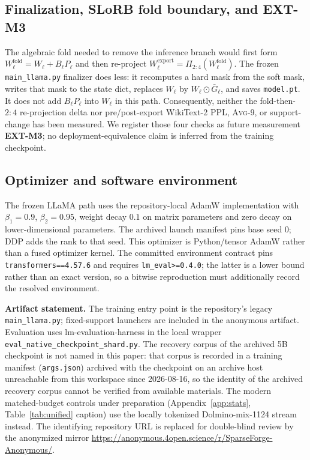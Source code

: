 \documentclass{article}
\newcommand{\taskavg}{\textsc{Avg}-9}
\begin{document}
\subsection{Finalization, SLoRB fold boundary, and EXT-M3}
The algebraic fold needed to remove the inference branch would first form
$W^{\mathrm{fold}}_\ell=W_\ell+B_\ell P_\ell$ and then re-project
$W^{\mathrm{export}}_\ell=\Pi_{2{:}4}(W^{\mathrm{fold}}_\ell)$. The frozen
\texttt{main\_llama.py} finalizer does less: it recomputes a hard mask from
the soft mask, writes that mask to the state dict, replaces
$W_\ell$ by $W_\ell\odot\bar G_\ell$, and saves \texttt{model.pt}. It does
not add $B_\ell P_\ell$ into $W_\ell$ in this path. Consequently, neither the
fold-then-$2{:}4$ re-projection delta nor pre/post-export WikiText-2 PPL,
\taskavg{}, or support-change has been measured. We register those four
checks as future measurement \textbf{EXT-M3}; no deployment-equivalence claim
is inferred from the training checkpoint.

\subsection{Optimizer and software environment}
The frozen LLaMA path uses the repository-local AdamW implementation with
$\beta_1=0.9$, $\beta_2=0.95$, weight decay $0.1$ on matrix parameters and
zero decay on lower-dimensional parameters. The archived launch manifest pins
base seed $0$; DDP adds the rank to that seed. This optimizer is Python/tensor
AdamW rather than a fused optimizer kernel. The committed environment contract
pins \texttt{transformers==4.57.6} and requires
\texttt{lm\_eval>=0.4.0}; the latter is a lower bound rather than an exact
version, so a bitwise reproduction must additionally record the resolved
environment.

\textbf{Artifact statement.} The training entry point is the repository's
legacy \texttt{main\_llama.py}; fixed-support launchers are included in the
anonymous artifact. Evaluation uses
lm-evaluation-harness in the local wrapper
\texttt{eval\_\allowbreak native\_\allowbreak checkpoint\_\allowbreak shard.py}.
The recovery corpus of the archived 5B checkpoint is not named in this paper:
that corpus is recorded in a training manifest (\texttt{args.json}) archived
with the checkpoint on an archive host unreachable from this workspace since
2026-08-16, so the identity of the archived recovery corpus cannot be verified
from available materials. The modern matched-budget controls under preparation
(Appendix~\ref{app:stats}, Table~\ref{tab:unified} caption) use the locally
tokenized Dolmino-mix-1124 stream instead. The identifying repository URL is
replaced for double-blind review by the anonymized mirror
\url{https://anonymous.4open.science/r/SparseForge-Anonymous/}.
\end{document}
